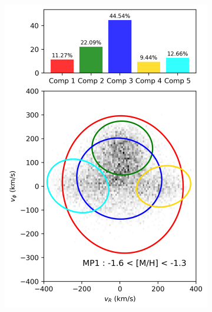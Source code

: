 \documentclass[a4paper,12pt]{article}
\begin{document}
\begin{figure}[h]
\begin{subfigure}[t]{0.24\textwidth}
        \includegraphics[width=\linewidth]{../figures/gmm_MP1.png}
    \end{subfigure}
    \hfill
    \begin{subfigure}[t]{0.24\textwidth}
        \centering

\end{subfigure}
\end{figure}
\end{document}
